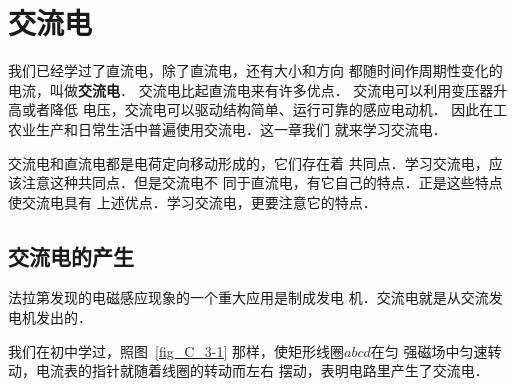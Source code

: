 \chapter{交流电}\label{chapter-alternating-current}

我们已经学过了直流电，除了直流电，还有大小和方向
都随时间作周期性变化的电流，叫做\textbf{交流电}．
交流电比起直流电来有许多优点．
交流电可以利用变压器升高或者降低
电压，交流电可以驱动结构简单、运行可靠的感应电动机．
因此在工农业生产和日常生活中普遍使用交流电．这一章我们
就来学习交流电．

交流电和直流电都是电荷定向移动形成的，它们存在着
共同点．学习交流电，应该注意这种共同点．但是交流电不
同于直流电，有它自己的特点．正是这些特点使交流电具有
上述优点．学习交流电，更要注意它的特点．

\section{交流电的产生}


法拉第发现的电磁感应现象的一个重大应用是制成发电
机．交流电就是从交流发电机发出的．

我们在初中学过，照图~\ref{fig_C_3-1} 那样，使矩形线圈$abcd$在匀
强磁场中匀速转动，电流表的指针就随着线圈的转动而左右
摆动，表明电路里产生了交流电．

